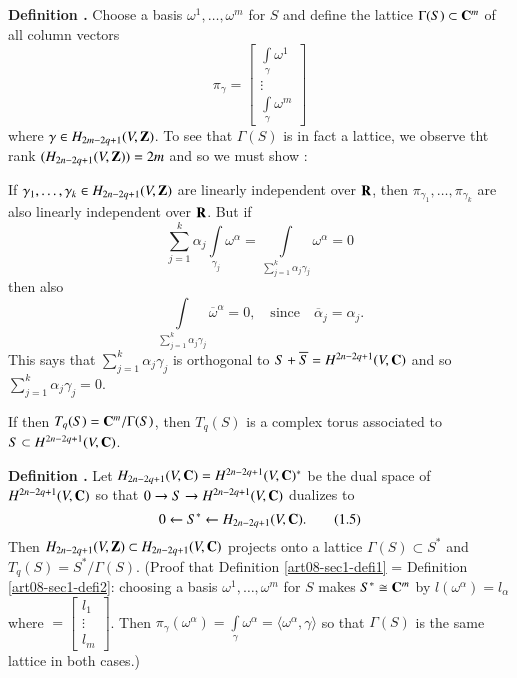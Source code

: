 \medskip
\noindent
{\bf Definition .\label{art08-sec1-defi1}}
Choose a basis $\omega^{1},\ldots,\omega^{m}$ for $S$ and define the lattice $\Gamma(S)\subset \mathbf{C}^{m}$ of all column vectors 
$$
\pi_{\gamma}=\left[\begin{smallmatrix} \int\limits_{\gamma}\omega^{1}\\ \vdots\\ \int\limits_{\gamma}\omega^{m}\end{smallmatrix}\right]
$$ 
where $\gamma\in H_{2m-2q+1}(V,\mathbf{Z})$. To see that $\Gamma(S)$ is in fact a lattice, we observe tht rank $(H_{2n-2q+1}(V,\mathbf{Z}))=2m$ and so we must show :
\smallskip

If $\gamma_{1},\ldots,\gamma_{k}\in H_{2n-2q+1}(V,\mathbf{Z})$ are linearly independent over $\mathbf{R}$, then $\pi_{\gamma_{1}},\ldots,\pi_{\gamma_{k}}$ are also linearly independent over $\mathbf{R}$. But if 
$$
\sum\limits^{k}_{j=1}\alpha_{j}\int\limits_{\gamma_{j}}\omega^{\alpha}=\int\limits_{\sum\limits^{k}_{j=1}\alpha_{j}\gamma_{j}} \omega^{\alpha}=0
$$\pageoriginale
then also
$$
\int\limits_{\sum\limits^{k}_{j=1}\alpha_{j}\gamma_{j}}\overline{\omega}^{\alpha}=0,\quad\text{since}\quad \overline{\alpha}_{j}=\alpha_{j}.
$$
This says that $\sum\limits^{k}_{j=1}\alpha_{j}\gamma_{j}$ is orthogonal to $S+\overline{S}=H^{2n-2q+1}(V,\mathbf{C})$ and so $\sum\limits^{k}_{j=1}\alpha_{j}\gamma_{j}=0$.

If then $T_{q}(S)=\mathbf{C}^{m}/\Gamma(S)$, then $T_{q}(S)$ is a complex torus associated to $S\subset H^{2n-2q+1}(V,\mathbf{C})$.

\medskip
\noindent
{\bf Definition .\label{art08-sec1-defi2}}
Let $H_{2n-2q+1}(V,\mathbf{C})=H^{2n-2q+1}(V,\mathbf{C})^{*}$ be the dual space of $H^{2n-2q+1}(V,\mathbf{C})$ so that $0\to S\to H^{2n-2q+1}(V,\mathbf{C})$ dualizes to 
\begin{equation*}
0\leftarrow S^{*}\leftarrow H_{2n-2q+1}(V,\mathbf{C}).\tag{1.5}\label{art08-sec1-eq1.5}
\end{equation*}
Then $H_{2n-2q+1}(V,\mathbf{Z})\subset H_{2n-2q+1}(V,\mathbf{C})$ projects onto a lattice $\Gamma(S)\subset S^{*}$ and $T_{q}(S)=S^{*}/\Gamma(S)$. (Proof that Definition \ref{art08-sec1-defi1} = Definition \ref{art08-sec1-defi2}: choosing a basis $\omega^{1},\ldots,\omega^{m}$ for $S$ makes $S^{*}\cong \mathbf{C}^{m}$ by $l(\omega^{\alpha})=l_{\alpha}$ where $=\left[\begin{smallmatrix} l_{1}\\ \vdots \\ l_{m}\end{smallmatrix}\right]$. Then $\pi_{\gamma}(\omega^{\alpha})=\int\limits_{\gamma}\omega^{\alpha}=\langle \omega^{\alpha},\gamma\rangle$ so that $\Gamma(S)$ is the same lattice in both cases.)

